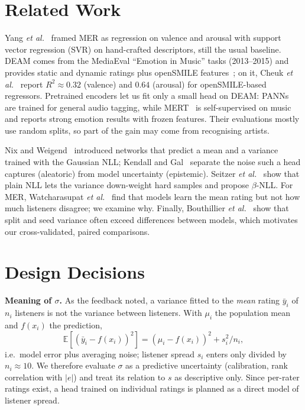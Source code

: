 \documentclass[conference]{IEEEtran}
\newcommand{\R}{R^2}
\begin{document}
\section{Related Work}
Yang \emph{et al.}~\cite{yang2008} framed MER as regression on valence and
arousal with support vector regression (SVR) on hand-crafted descriptors,
still the usual baseline. DEAM comes from the MediaEval ``Emotion in Music''
tasks (2013--2015) and provides static and dynamic ratings plus openSMILE
features~\cite{aljanaki2017}; on it, Cheuk \emph{et al.}~\cite{cheuk2020}
report $\R\approx0.32$ (valence) and $0.64$ (arousal) for openSMILE-based
regressors. Pretrained encoders let us fit only a small head on DEAM:
PANNs~\cite{kong2020} are trained for general audio tagging, while
MERT~\cite{li2024mert} is self-supervised on music and reports strong emotion
results with frozen features. Their evaluations mostly use random splits, so
part of the gain may come from recognising artists.

Nix and Weigend~\cite{nix1994} introduced networks that predict a mean and a
variance trained with the Gaussian NLL; Kendall and Gal~\cite{kendall2017}
separate the noise such a head captures (aleatoric) from model uncertainty
(epistemic). Seitzer \emph{et al.}~\cite{seitzer2022} show that plain NLL lets
the variance down-weight hard samples and propose $\beta$-NLL. For MER,
Watcharasupat \emph{et al.}~\cite{watcharasupat2025} find that models learn
the mean rating but not how much listeners disagree; we examine why. Finally,
Bouthillier \emph{et al.}~\cite{bouthillier2021} show that split and seed
variance often exceed differences between models, which motivates our
cross-validated, paired comparisons.

\section{Design Decisions}
\textbf{Meaning of $\sigma$.} As the feedback noted, a variance fitted to the
\emph{mean} rating $\bar y_i$ of $n_i$ listeners is not the variance between
listeners. With $\mu_i$ the population mean and $f(x_i)$ the prediction,
\begin{equation}
\mathbb{E}[(\bar y_i - f(x_i))^2] = (\mu_i - f(x_i))^2 + s_i^2/n_i ,
\label{eq:sigma}
\end{equation}
i.e.\ model error plus averaging noise; listener spread $s_i$ enters only
divided by $n_i\approx10$. We therefore evaluate $\sigma$ as a predictive
uncertainty (calibration, rank correlation with $|e|$) and treat its relation
to $s$ as descriptive only. Since per-rater ratings exist, a head trained on
individual ratings is planned as a direct model of listener spread.
\end{document}
